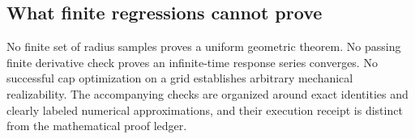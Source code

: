 \subsection{What finite regressions cannot prove}
No finite set of radius samples proves a uniform geometric theorem. No passing finite derivative check proves an infinite-time response series converges. No successful cap optimization on a grid establishes arbitrary mechanical realizability. The accompanying checks are organized around exact identities and clearly labeled numerical approximations, and their execution receipt is distinct from the mathematical proof ledger.
\par

